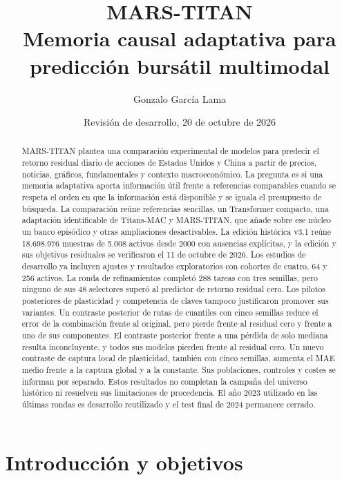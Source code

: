 \documentclass[11pt,a4paper]{report}
\title{MARS-TITAN\\\large Memoria causal adaptativa para predicción bursátil multimodal}
\author{Gonzalo García Lama}
\date{Revisión de desarrollo, 20 de octubre de 2026}
\begin{document}
\maketitle
\begin{abstract}
MARS-TITAN plantea una comparación experimental de modelos para predecir el
retorno residual diario de acciones de Estados Unidos y China a partir de
precios, noticias, gráficos, fundamentales y contexto macroeconómico. La
pregunta es si una memoria adaptativa aporta información útil frente a
referencias comparables cuando se respeta el orden en que la información está
disponible y se iguala el presupuesto de búsqueda. La comparación reúne
referencias sencillas, un Transformer compacto, una adaptación identificable
de Titans-MAC y MARS-TITAN, que añade sobre ese núcleo un banco episódico y
otras ampliaciones desactivables. La edición histórica v3.1 reúne 18.698.976
muestras de 5.008 activos desde 2000 con ausencias explícitas, y la edición y
sus objetivos residuales se verificaron el 11 de octubre de 2026. Los estudios
de desarrollo ya incluyen ajustes y resultados exploratorios con cohortes de
cuatro, 64 y 256 activos. La ronda de refinamientos completó 288 tareas con
tres semillas, pero ninguno de sus 48 selectores superó al predictor de retorno
residual cero. Los pilotos posteriores de plasticidad y competencia de claves
tampoco justificaron promover sus variantes. Un contraste posterior de rutas
de cuantiles con cinco semillas reduce el error de la combinación frente al
original, pero pierde frente al residual cero y frente a uno de sus
componentes. El contraste posterior frente a una pérdida de solo mediana
resulta inconcluyente, y todos sus modelos pierden frente al residual cero.
Un nuevo contraste de captura local de plasticidad, también con cinco
semillas, aumenta el MAE medio frente a la captura global y a la constante.
Sus poblaciones, controles y costes se informan por separado.
Estos resultados no completan la campaña del
universo histórico ni resuelven sus limitaciones de procedencia. El año 2023
utilizado en las últimas rondas es desarrollo reutilizado y el test final de
2024 permanece cerrado.
\end{abstract}
\tableofcontents

\chapter{Introducción y objetivos}
\end{document}
